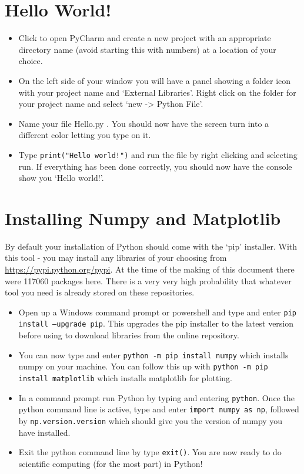 \documentclass{article}
\begin{document}
\section{Hello World!}

\begin{itemize}
  \item Click to open PyCharm and create a new project with an appropriate directory name (avoid starting this with numbers) at a location of your choice.
  \item On the left side of your window you will have a panel showing a folder icon with your project name and `External Libraries'. Right click on the folder for your project name and select `new -> Python File'.
  \item Name your file Hello.py . You should now have the screen turn into a different color letting you type on it.
  \item Type \texttt{print("Hello world!")} and run the file by right clicking and selecting run. If everything has been done correctly, you should now have the console show you `Hello world!'.
\end{itemize}

\section{Installing Numpy and Matplotlib}

By default your installation of Python should come with the `pip' installer. With this tool - you may install any libraries of your choosing from \url{https://pypi.python.org/pypi}. At the time of the making of this document there were 117060 packages here. There is a very very high probability that whatever tool you need is already stored on these repositories.

\begin{itemize}
  \item Open up a Windows command prompt or powershell and type and enter \texttt{pip install --upgrade pip}. This upgrades the pip installer to the latest version before using to download libraries from the online repository.
  \item You can now type and enter \texttt{python -m pip install numpy} which installs numpy on your machine. You can follow this up with \texttt{python -m pip install matplotlib} which installs matplotlib for plotting.
  \item In a command prompt run Python by typing and entering \texttt{python}. Once the python command line is active, type and enter \texttt{import numpy as np}, followed by \texttt{np.version.version} which should give you the version of numpy you have installed.
  \item Exit the python command line by type \texttt{exit()}. You are now ready to do scientific computing (for the most part) in Python!
\end{itemize}
\end{document}

